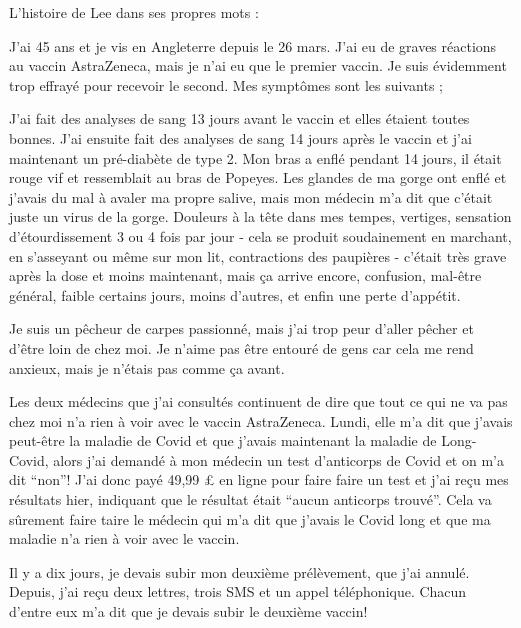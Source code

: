 L'histoire de Lee dans ses propres mots :

J'ai 45 ans et je vis en Angleterre depuis le 26 mars. J'ai eu de graves
réactions au vaccin AstraZeneca, mais je n'ai eu que le premier vaccin. Je suis
évidemment trop effrayé pour recevoir le second. Mes symptômes sont les suivants
;

J'ai fait des analyses de sang 13 jours avant le vaccin et elles étaient toutes
bonnes. J'ai ensuite fait des analyses de sang 14 jours après le vaccin et j'ai
maintenant un pré-diabète de type 2. Mon bras a enflé pendant 14 jours, il était
rouge vif et ressemblait au bras de Popeyes. Les glandes de ma gorge ont enflé
et j'avais du mal à avaler ma propre salive, mais mon médecin m'a dit que
c'était juste un virus de la gorge. Douleurs à la tête dans mes tempes,
vertiges, sensation d'étourdissement 3 ou 4 fois par jour - cela se produit
soudainement en marchant, en s'asseyant ou même sur mon lit, contractions des
paupières - c'était très grave après la dose et moins maintenant, mais ça arrive
encore, confusion, mal-être général, faible certains jours, moins d'autres, et
enfin une perte d'appétit.

Je suis un pêcheur de carpes passionné, mais j'ai trop peur d'aller pêcher et
d'être loin de chez moi. Je n'aime pas être entouré de gens car cela me rend
anxieux, mais je n'étais pas comme ça avant.

Les deux médecins que j'ai consultés continuent de dire que tout ce qui ne va
pas chez moi n'a rien à voir avec le vaccin AstraZeneca. Lundi, elle m'a dit que
j'avais peut-être la maladie de Covid et que j'avais maintenant la maladie de
Long-Covid, alors j'ai demandé à mon médecin un test d'anticorps de Covid et on
m'a dit “non”! J'ai donc payé 49,99 £ en ligne pour faire faire un test et j'ai
reçu mes résultats hier, indiquant que le résultat était “aucun anticorps
trouvé”. Cela va sûrement faire taire le médecin qui m'a dit que j'avais le
Covid long et que ma maladie n'a rien à voir avec le vaccin.

Il y a dix jours, je devais subir mon deuxième prélèvement, que j'ai
annulé. Depuis, j'ai reçu deux lettres, trois SMS et un appel
téléphonique. Chacun d'entre eux m'a dit que je devais subir le deuxième vaccin!

